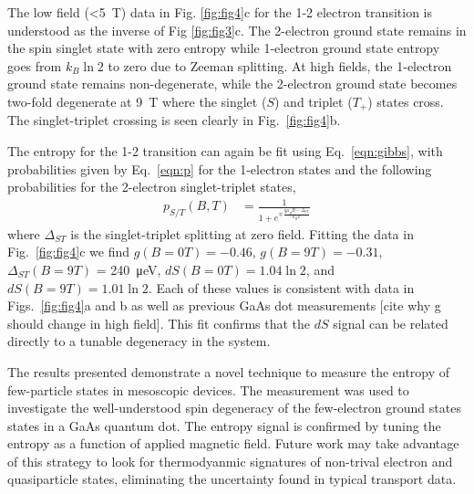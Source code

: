 \documentclass[preprint,showpacs,preprintnumbers,amsmath,amssymb,pra,aps,superscriptaddress]{revtex4-1}
\begin{document}
The low field (\SI{<5}{\tesla}) data in Fig. \ref{fig:fig4}c for the 1-2 electron transition is understood as the inverse of Fig \ref{fig:fig3}c. The 2-electron ground state remains in the spin singlet state with zero entropy while 1-electron ground state entropy goes from $k_B\ln{2}$ to zero due to Zeeman splitting. At high fields, the 1-electron ground state remains non-degenerate, while the 2-electron ground state becomes two-fold degenerate at \SI{9}{\tesla} where the singlet ($S$) and triplet ($T_+$) states cross. The singlet-triplet crossing is seen clearly in Fig.~\ref{fig:fig4}b. 

The entropy for the 1-2 transition can again be fit using Eq.~\ref{eqn:gibbs}, with probabilities given by Eq.~\ref{eqn:p} for the 1-electron states and the following probabilities for the 2-electron singlet-triplet states,
%
\begin{align}
\label{eqn:pst}
        p_{S/T}(B, T) &= \frac{1}{1+ e^{\mp \frac{g\mu_B B - \Delta_{ST}}{k_B T}}}
\end{align}
%
where $\Delta_{ST}$ is the singlet-triplet splitting at zero field. Fitting the data in Fig.~\ref{fig:fig4}c we find $g(B{=}0T)=-0.46$, $g(B{=}9T)=-0.31$, $\Delta_{ST}(B{=}9T)$ = \SI{240}{\micro\electronvolt}, $dS(B{=}0T) = 1.04\ln{2}$, and $dS(B{=}9T) = 1.01\ln{2}$. Each of these values is consistent with data in Figs.~\ref{fig:fig4}a and b as well as previous GaAs dot measurements [cite why g should change in high field]. This fit confirms that the $dS$ signal can be related directly to a tunable degeneracy in the system.

The results presented demonstrate a novel technique to measure the entropy of few-particle states in mesoscopic devices. The measurement was used to investigate the well-understood spin degeneracy of the few-electron ground states states in a GaAs quantum dot. The entropy signal is confirmed by tuning the entropy as a function of applied magnetic field. Future work may take advantage of this strategy to look for thermodyanmic signatures of non-trival electron and quasiparticle states, eliminating the uncertainty found in typical transport data.


{}

\end{document}
